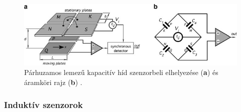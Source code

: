 \begin{figure}
	\centering
	\includegraphics{figures/kapacitiv_hid.png}
	\caption{Párhuzamos lemezű kapacitív híd szenzorbeli elhelyezése (\textbf{a}) és áramköri rajz (\textbf{b}) \cite{Fraden2016a}.}
	\label{kapacitiv_hid}
\end{figure}

\subsubsection{Induktív szenzorok}
\label{linind}

